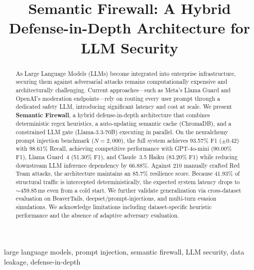 \documentclass[conference]{IEEEtran}
\begin{document}
\title{Semantic Firewall: A Hybrid Defense-in-Depth Architecture for LLM Security}

\author{
}

\maketitle

\begin{abstract}
As Large Language Models (LLMs) become integrated into enterprise infrastructure, securing them against adversarial attacks remains computationally expensive and architecturally challenging. Current approaches---such as Meta's Llama Guard and OpenAI's moderation endpoints---rely on routing every user prompt through a dedicated safety LLM, introducing significant latency and cost at scale. We present \textbf{Semantic Firewall}, a hybrid defense-in-depth architecture that combines deterministic regex heuristics, a auto-updating semantic cache (ChromaDB), and a constrained LLM gate (Llama-3.3-70B) executing in parallel. On the neuralchemy prompt injection benchmark ($N{=}2{,}000$), the full system achieves 93.57\% F1 ($\pm$0.42) with 98.61\% Recall, achieving competitive performance with GPT-4o-mini (90.00\% F1), Llama Guard~4 (51.30\% F1), and Claude~3.5 Haiku (83.20\% F1) while reducing downstream LLM inference dependency by 66.88\%. Against 210 manually crafted Red Team attacks, the architecture maintains an 85.7\% resilience score. Because 41.93\% of structural traffic is intercepted deterministically, the expected system latency drops to $\sim$459.85\,ms even from a cold start. We further validate generalization via cross-dataset evaluation on BeaverTails, deepset/prompt-injections, and multi-turn evasion simulations. We acknowledge limitations including dataset-specific heuristic performance and the absence of adaptive adversary evaluation.
\end{abstract}

\begin{IEEEkeywords}
large language models, prompt injection, semantic firewall, LLM security, data leakage, defense-in-depth
\end{IEEEkeywords}

\end{document}
